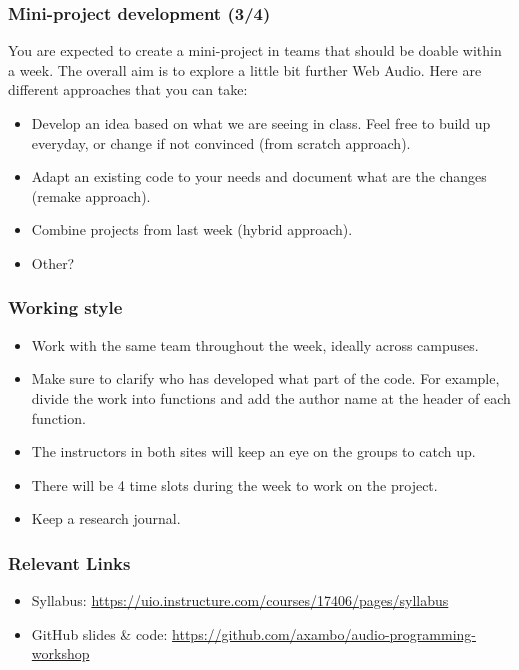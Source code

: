 \documentclass[screen, aspectratio=43]{beamer}
\begin{document}
%
\begin{frame}
\frametitle{Mini-project development (3/4)}
You are expected to create a mini-project in teams that should be doable within a week. The overall aim is to explore a little bit further Web Audio. Here are different approaches that you can take:
\begin{itemize}
\item Develop an idea based on what we are seeing in class. Feel free to build up everyday, or change if not convinced (from scratch approach).
\item Adapt an existing code to your needs and document what are the changes (remake approach).
\item Combine projects from last week (hybrid approach).
\item Other?
\end{itemize}
\end{frame}
%
\begin{frame}
\frametitle{Working style}
\begin{itemize}
\item Work with the same team throughout the week, ideally across campuses. 
\item Make sure to clarify who has developed what part of the code. For example, divide the work into functions and add the author name at the header of each function.
\item The instructors in both sites will keep an eye on the groups to catch up.
\item There will be 4 time slots during the week to work on the project. 
\item Keep a research journal.
\end{itemize}
\end{frame}
%
\begin{frame}
\frametitle{Relevant Links}
\begin{itemize}
\item Syllabus: \url{https://uio.instructure.com/courses/17406/pages/syllabus}
\item GitHub slides \& code: \url{https://github.com/axambo/audio-programming-workshop}
\end{itemize}
\end{frame}
%
%
\end{document}

